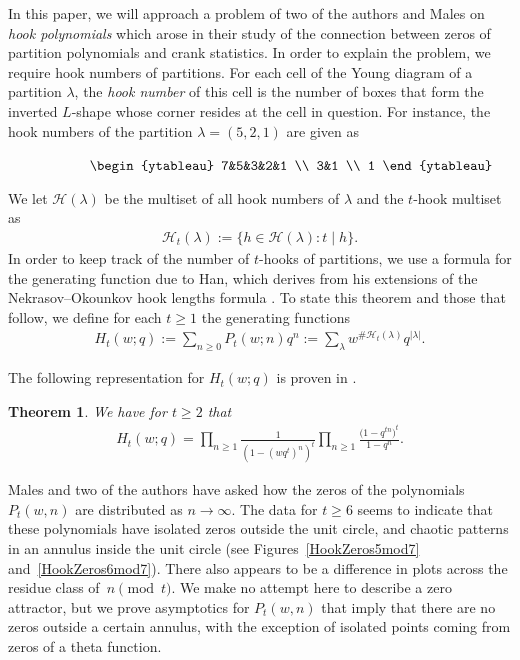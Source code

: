 \documentclass[pdftex]{sigma}
\numberwithin{equation}{section}
\newtheorem{Theorem}{Theorem}[section]
\def\lp{\left(}
\def\rp{\right)}
\begin{document}
In this paper, we will approach a problem of two of the authors and Males \cite{FMR} on {\it hook polynomials} which arose in their study of the connection between zeros of partition polynomials and crank statistics. In order to explain the problem, we require hook numbers of partitions. For each cell of the Young diagram of a partition $\lambda$, the {\it hook number} of this cell is the number of boxes that form the inverted $L$-shape whose corner resides at the cell in question. For instance, the hook numbers of the partition $\lambda = \lp 5, 2, 1 \rp$ are given as
\begin{figure}[ht] ${\hspace{0.4in} \begin{ytableau} 7&5&3&2&1 \\ 3&1 \\ 1 \end{ytableau}}$
\end{figure}

 We let $\mathcal H(\lambda)$ be the multiset of all hook numbers of $\lambda$ and the $t$-hook multiset as
\begin{align*}
 \mathcal H_t(\lambda) := \{ h \in \mathcal H(\lambda) : t \mid h \}.
\end{align*}
In order to keep track of the number of $t$-hooks of partitions, we use a formula for the generating function due to Han, which derives from his extensions of the Nekrasov--Okounkov hook lengths formula \cite{Han,NekOk}. To state this theorem and those that follow, we define for each $t \geq 1$ the generating functions
\begin{align*}
 H_t\lp w;q \rp := \sum_{n \geq 0} P_t(w;n) q^n := \sum_{\lambda} w^{\#\mathcal H_t(\lambda)} q^{|\lambda|} .
\end{align*}

The following representation for $H_t(w;q)$ is proven in \cite[Corollary 5.1]{Han}.

\begin{Theorem}
 We have for $t \geq 2$ that
 \begin{align*}
 H_t(w;q) = \prod_{n \geq 1} \frac{1}{(1-(wq^t)^n)^t}\prod_{n \geq 1} \frac{\big(1-q^{tn}\big)^t}{1-q^n}.
 \end{align*}
\end{Theorem}

Males and two of the authors \cite{FMR} have asked how the zeros of the polynomials $P_t(w,n)$ are distributed as $n \to \infty$. The data for $t \geq 6$ seems to indicate that these polynomials have isolated zeros outside the unit circle, and chaotic patterns in an annulus inside the unit circle (see Figures~\ref{HookZeros5mod7} and~\ref{HookZeros6mod7}). There also appears to be a difference in plots across the residue class of~${n \pmod{t}}$. We make no attempt here to describe a zero attractor, but we prove asymptotics for $P_t(w,n)$ that imply that there are no zeros outside a certain annulus, with the exception of isolated points coming from zeros of a theta function.
\end{document}
